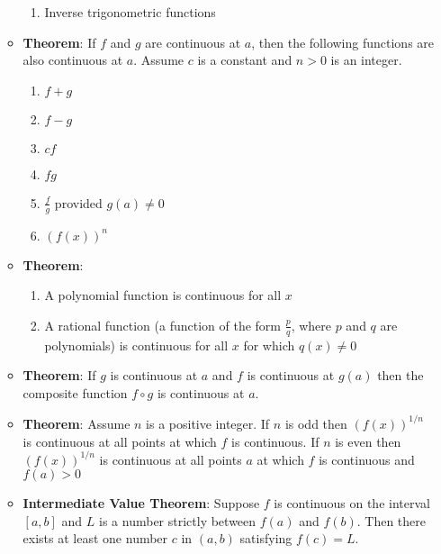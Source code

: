 \documentclass{article}
\begin{document}
\begin{itemize}
\begin{itemize}
\begin{enumerate}
			\item Inverse trigonometric functions
		\end{enumerate}
		\item \textbf{Theorem}: If $f$ and $g$ are continuous at $a$, then the following functions are also continuous at $a$. Assume $c$ is a constant and $n > 0$ is an integer.
		\begin{enumerate}
			\item $f + g$
			\item $f - g$
			\item $cf$
			\item $fg$
			\item $\frac{f}{g}$ provided $g(a) \neq 0$
			\item $(f(x))^n$
		\end{enumerate}
		\item \textbf{Theorem}:
		\begin{enumerate}
			\item A polynomial function is continuous for all $x$
			\item A rational function (a function of the form $\frac{p}{q}$, where $p$ and $q$ are polynomials) is continuous for all $x$ for which $q(x) \neq 0$
		\end{enumerate}
		\item \textbf{Theorem}: If $g$ is continuous at $a$ and $f$ is continuous at $g(a)$ then the composite function $f \circ g$ is continuous at $a$. \\
		\item \textbf{Theorem}: Assume $n$ is a positive integer. If $n$ is odd then $(f(x))^{1/n}$ is continuous at all points at which $f$ is continuous. If $n$ is even then $(f(x))^{1/n}$ is continuous at all points $a$ at which $f$ is continuous and $f(a) > 0$ \\
		\item \textbf{Intermediate Value Theorem}: Suppose $f$ is continuous on the interval $[a, b]$ and $L$ is a number strictly between $f(a)$ and $f(b)$. Then there exists at least one number $c$ in $(a,b)$ satisfying $f(c) = L$.
	\end{itemize}
\end{itemize}
\end{document}
